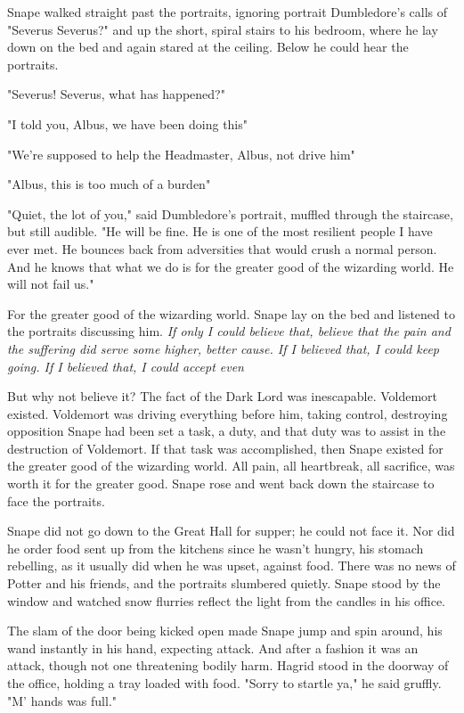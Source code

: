 Snape walked straight past the portraits, ignoring portrait Dumbledore's calls of "Severus{\el} Severus?" and up the short, spiral stairs to his bedroom, where he lay down on the bed and again stared at the ceiling. Below he could hear the portraits.

"Severus! Severus, what has happened?"

"I told you, Albus, we have been doing this{\el}"

"We're supposed to help the Headmaster, Albus, not drive him{\el}"

"Albus, this is too much of a burden{\el}"

"Quiet, the lot of you," said Dumbledore's portrait, muffled through the staircase, but still audible. "He will be fine. He is one of the most resilient people I have ever met. He bounces back from adversities that would crush a normal person. And he knows that what we do is for the greater good of the wizarding world. He will not fail us."

For the greater good of the wizarding world. Snape lay on the bed and listened to the portraits discussing him. \emph{If only I could believe that, believe that the pain and the suffering did serve some higher, better cause. If I believed that, I could keep going. If I believed that, I could accept even{\el}}

But why not believe it? The fact of the Dark Lord was inescapable. Voldemort existed. Voldemort was driving everything before him, taking control, destroying opposition{\el} Snape had been set a task, a duty, and that duty was to assist in the destruction of Voldemort. If that task was accomplished, then Snape existed for the greater good of the wizarding world. All pain, all heartbreak, all sacrifice, was worth it for the greater good. Snape rose and went back down the staircase to face the portraits.

\sbreak

Snape did not go down to the Great Hall for supper; he could not face it. Nor did he order food sent up from the kitchens since he wasn't hungry, his stomach rebelling, as it usually did when he was upset, against food. There was no news of Potter and his friends, and the portraits slumbered quietly. Snape stood by the window and watched snow flurries reflect the light from the candles in his office.

The slam of the door being kicked open made Snape jump and spin around, his wand instantly in his hand, expecting attack. And after a fashion it was an attack, though not one threatening bodily harm. Hagrid stood in the doorway of the office, holding a tray loaded with food. "Sorry to startle ya," he said gruffly. "M' hands was full."

